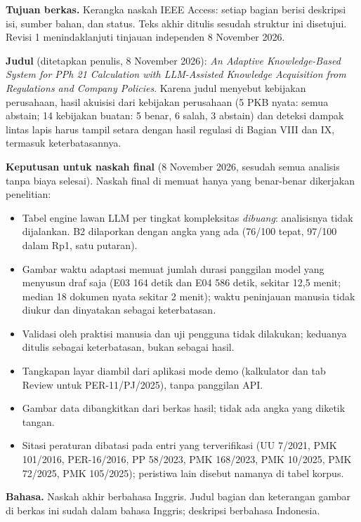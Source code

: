 \documentclass{ieeeaccess}
\newenvironment{isi}{\par\smallskip\footnotesize\color{draftblue}\noindent}{\par\smallskip\normalsize\color{black}}
\begin{document}
\begin{isi}
\textbf{Tujuan berkas.} Kerangka naskah IEEE Access: setiap bagian berisi deskripsi isi, sumber bahan, dan status. Teks akhir ditulis sesudah struktur ini disetujui. Revisi 1 menindaklanjuti tinjauan independen 8 November 2026.

\textbf{Judul} (ditetapkan penulis, 8 November 2026): \textit{An Adaptive Knowledge-Based System for PPh 21 Calculation with LLM-Assisted Knowledge Acquisition from Regulations and Company Policies}. Karena judul menyebut kebijakan perusahaan, hasil akuisisi dari kebijakan perusahaan (5 PKB nyata: semua abstain; 14 kebijakan buatan: 5 benar, 6 salah, 3 abstain) dan deteksi dampak lintas lapis harus tampil setara dengan hasil regulasi di Bagian VIII dan IX, termasuk keterbatasannya.

\textbf{Keputusan untuk naskah final} (8 November 2026, sesudah semua analisis tanpa biaya selesai). Naskah final di  memuat hanya yang benar-benar dikerjakan penelitian:
\begin{itemize}
\item Tabel engine lawan LLM per tingkat kompleksitas \emph{dibuang}: analisisnya tidak dijalankan. B2 dilaporkan dengan angka yang ada (76/100 tepat, 97/100 dalam Rp1, satu putaran).
\item Gambar waktu adaptasi memuat jumlah durasi panggilan model yang menyusun draf saja (E03 164 detik dan E04 586 detik, sekitar 12,5 menit; median 18 dokumen nyata sekitar 2 menit); waktu peninjauan manusia tidak diukur dan dinyatakan sebagai keterbatasan.
\item Validasi oleh praktisi manusia dan uji pengguna tidak dilakukan; keduanya ditulis sebagai keterbatasan, bukan sebagai hasil.
\item Tangkapan layar diambil dari aplikasi mode demo (kalkulator dan tab Review untuk PER-11/PJ/2025), tanpa panggilan API.
\item Gambar data dibangkitkan  dari berkas hasil; tidak ada angka yang diketik tangan.
\item Sitasi peraturan dibatasi pada entri yang terverifikasi (UU 7/2021, PMK 101/2016, PER-16/2016, PP 58/2023, PMK 168/2023, PMK 10/2025, PMK 72/2025, PMK 105/2025); peristiwa lain disebut namanya di tabel korpus.
\end{itemize}

\textbf{Bahasa.} Naskah akhir berbahasa Inggris. Judul bagian dan keterangan gambar di berkas ini sudah dalam bahasa Inggris; deskripsi berbahasa Indonesia.


\end{isi}
\end{document}
